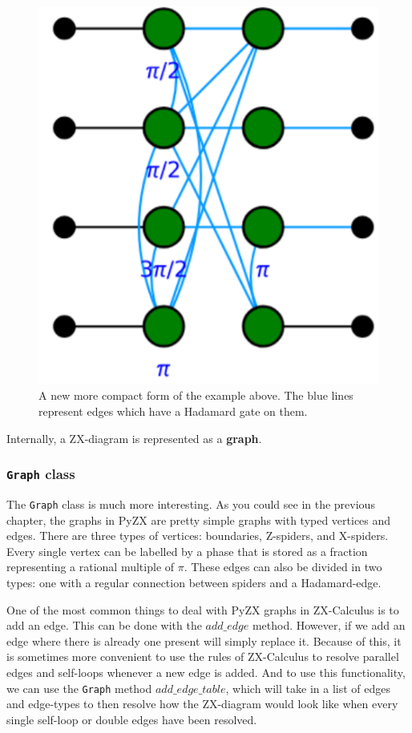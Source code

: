 \begin{figure}[ht]
        \centering
        \includegraphics[scale = 0.5]{Figures/companentex.png}
        \caption{A new more compact form of the example above. The blue lines represent edges which have a Hadamard gate on them.}
        \label{fig:diagram-ex}
    \end{figure}

Internally, a ZX-diagram is represented as a \textbf{graph}.

\subsubsection{\texttt{Graph} class}
The \texttt{Graph} class is much more interesting. As you could see in the previous chapter, the graphs in PyZX are pretty simple graphs with typed vertices and edges. There are three types of vertices: boundaries, Z-spiders, and X-spiders. Every single vertex can be labelled by a phase that is stored as a fraction representing a rational multiple of $\pi$. These edges can also be divided in two types: one with a regular connection between spiders and a Hadamard-edge. 

One of the most common things to deal with PyZX graphs in ZX-Calculus is to add an edge. This can be done with the \texttt{$add\_edge$} method. However, if we add an edge where there is already one present will simply replace it. Because of this, it is sometimes more convenient to use the rules of ZX-Calculus to resolve parallel edges and self-loops whenever a new edge is added. And to use this functionality, we can use the \texttt{Graph} method \texttt{$add\_edge\_table$}, which will take in a list of edges and edge-types to then resolve how the ZX-diagram would look like when every single self-loop or double edges have been resolved. 

